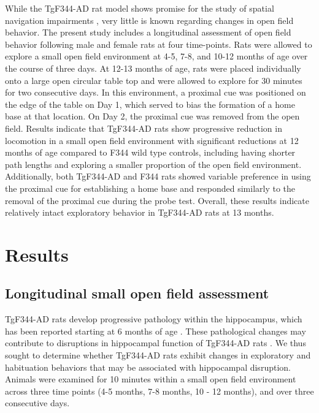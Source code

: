 \documentclass[fleqn,10pt]{wlscirep}
\begin{document}
While the TgF344-AD rat model shows promise for the study of spatial navigation impairments \cite{berkowitz_progressive_2018}, very little is known regarding changes in open field behavior.  The present study includes a longitudinal assessment of open field behavior following male and female rats at four time-points. Rats were allowed to explore a small open field environment at 4-5, 7-8, and 10-12 months of age over the course of three days. At 12-13 months of age, rats were placed individually onto a large open circular table top and were allowed to explore for 30 minutes for two consecutive days. In this environment, a proximal cue was positioned on the edge of the table on Day 1, which served to bias the formation of a home base at that location. On Day 2, the proximal cue was removed from the open field. Results indicate that TgF344-AD rats show progressive reduction in locomotion in a small open field environment with significant reductions at 12 months of age compared to F344 wild type controls, including having shorter path lengths and exploring a smaller proportion of the open field environment. Additionally, both TgF344-AD and F344 rats showed variable preference in using the proximal cue for establishing a home base and responded similarly to the removal of the proximal cue during the probe test. Overall, these results indicate relatively intact exploratory behavior in TgF344-AD rats at 13 months.   

\section*{Results}

\subsection*{Longitudinal small open field assessment}

TgF344-AD rats develop progressive pathology within the hippocampus, which has been reported starting at 6 months of age \cite{cohen_transgenic_2013}. These pathological changes may contribute to disruptions in hippocampal function of TgF344-AD rats \cite{stoiljkovic_altered_2018}. We thus sought to determine whether TgF344-AD rats exhibit changes in exploratory and habituation behaviors that may be associated with hippocampal disruption. Animals were examined for 10 minutes within a small open field environment across three time points (4-5 months, 7-8 months, 10 - 12 months), and over three consecutive days. 
\end{document}
